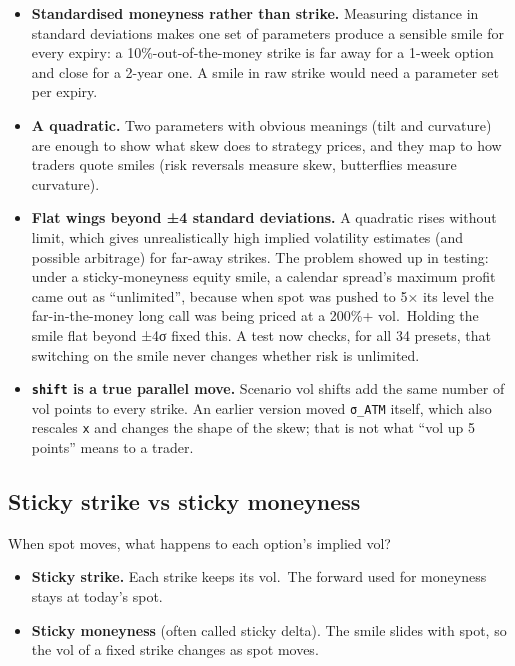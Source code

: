 \documentclass[10pt,a4paper]{article}
\providecommand{\tightlist}{\setlength{\itemsep}{1pt}\setlength{\parskip}{0pt}}
\numberwithin{equation}{section}
\begin{document}
\begin{itemize}
\tightlist
\item
  \textbf{Standardised moneyness rather than strike.} Measuring distance in standard deviations makes one set of parameters produce a sensible smile for every expiry: a 10\%-out-of-the-money strike is far away for a 1-week option and close for a 2-year one. A smile in raw strike would need a parameter set per expiry.
\item
  \textbf{A quadratic.} Two parameters with obvious meanings (tilt and curvature) are enough to show what skew does to strategy prices, and they map to how traders quote smiles (risk reversals measure skew, butterflies measure curvature).
\item
  \textbf{Flat wings beyond ±4 standard deviations.} A quadratic rises without limit, which gives unrealistically high implied volatility estimates (and possible arbitrage) for far-away strikes. The problem showed up in testing: under a sticky-moneyness equity smile, a calendar spread's maximum profit came out as ``unlimited'', because when spot was pushed to 5× its level the far-in-the-money long call was being priced at a 200\%+ vol.~Holding the smile flat beyond ±4σ fixed this. A test now checks, for all 34 presets, that switching on the smile never changes whether risk is unlimited.
\item
  \textbf{\texttt{shift} is a true parallel move.} Scenario vol shifts add the same number of vol points to every strike. An earlier version moved \texttt{σ\_ATM} itself, which also rescales \texttt{x} and changes the shape of the skew; that is not what ``vol up 5 points'' means to a trader.
\end{itemize}

\subsection{Sticky strike vs sticky moneyness}\label{sticky-strike-vs-sticky-moneyness}

When spot moves, what happens to each option's implied vol?

\begin{itemize}
\tightlist
\item
  \textbf{Sticky strike.} Each strike keeps its vol.~The forward used for moneyness stays at today's spot.
\item
  \textbf{Sticky moneyness} (often called sticky delta). The smile slides with spot, so the vol of a fixed strike changes as spot moves.
\end{itemize}
\end{document}
